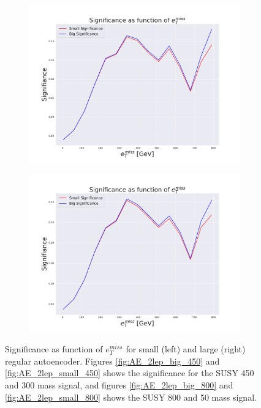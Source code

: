 \begin{figure}[H]
\begin{subfigure}{.45\textwidth}
        \caption{}
        \label{fig:AE_2lep_small_450_signi}
    \end{subfigure}
    \hfill
    \begin{subfigure}{.45\textwidth}
        \includegraphics[width=\textwidth]{Figures/AE_testing/big/2lep/significance_etmiss_800p0p050.pdf}
        \caption{}
        \label{fig:AE_2lep_big_800_signi}
    \end{subfigure}
    \hfill   
    \begin{subfigure}{.45\textwidth}
        \includegraphics[width=\textwidth]{Figures/AE_testing/small/2lep/significance_etmiss_800p0p050.pdf}
        \caption{}
        \label{fig:AE_2lep_small_800_signi}
    \end{subfigure}
    \hfill      
    \caption[AE | Significance as function of $e_T^{miss}$]{Significance as function of $e_T^{miss}$ for small (left) and large (right) 
    regular autoencoder. Figures \ref{fig:AE_2lep_big_450} and \ref{fig:AE_2lep_small_450} shows the significance for the SUSY 450 and 
    300 mass signal, and figures \ref{fig:AE_2lep_big_800} and \ref{fig:AE_2lep_small_800} shows the SUSY 800 and 50 mass signal.}
    \label{fig:AE_2lep_recon_err_both_sig_signi}
\end{figure}


